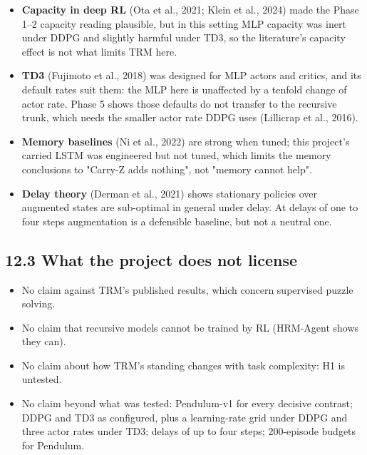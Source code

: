 \documentclass[11pt]{article}
\begin{document}
\begin{itemize}
\item \textbf{Capacity in deep RL} (Ota et al., 2021; Klein et al., 2024) made the Phase 1--2 capacity reading plausible, but in this setting MLP capacity was inert under DDPG and slightly harmful under TD3, so the literature's capacity effect is not what limits TRM here.
\item \textbf{TD3} (Fujimoto et al., 2018) was designed for MLP actors and critics, and its default rates suit them: the MLP here is unaffected by a tenfold change of actor rate. Phase 5 shows those defaults do not transfer to the recursive trunk, which needs the smaller actor rate DDPG uses (Lillicrap et al., 2016).
\item \textbf{Memory baselines} (Ni et al., 2022) are strong when tuned; this project's carried LSTM was engineered but not tuned, which limits the memory conclusions to "Carry-Z adds nothing", not "memory cannot help".
\item \textbf{Delay theory} (Derman et al., 2021) shows stationary policies over augmented states are sub-optimal in general under delay. At delays of one to four steps augmentation is a defensible baseline, but not a neutral one.
\end{itemize}



\subsection*{12.3 What the project does not license}



\begin{itemize}
\item No claim against TRM's published results, which concern supervised puzzle solving.
\item No claim that recursive models cannot be trained by RL (HRM-Agent shows they can).
\item No claim about how TRM's standing changes with task complexity: H1 is untested.
\item No claim beyond what was tested: Pendulum-v1 for every decisive contrast; DDPG and TD3 as configured, plus a learning-rate grid under DDPG and three actor rates under TD3; delays of up to four steps; 200-episode budgets for Pendulum.
\end{itemize}



\medskip
\end{document}

